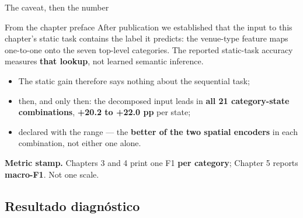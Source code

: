 \documentclass{beamer}
\begin{document}
\begin{frame}{The caveat, then the number}
    \begin{alertblock}{From the chapter preface}
        \small
        After publication we established that the input to this chapter's static task
        \alert{contains the label it predicts}: the venue-type feature maps one-to-one onto the
        seven top-level categories. The reported static-task accuracy measures \textbf{that
        lookup}, not learned semantic inference.
    \end{alertblock}

    \medskip
    \begin{itemize}\setlength{\itemsep}{3pt}
        \item<1-> \alert{The static gain therefore says nothing about the sequential task};
        \item<2-> then, and only then: the decomposed input leads in \textbf{all 21
              category-state combinations}, \textbf{+20.2 to +22.0 pp} per state;
        \item<2-> declared with the range --- the \textbf{better of the two spatial encoders} in
              each combination, not either one alone.
    \end{itemize}

    \vfill
    {\scriptsize\color{secondary}\textbf{Metric stamp.} Chapters 3 and 4 print one F1
    \textbf{per category}; Chapter 5 reports \textbf{macro-F1}. Not one scale.\par}
\end{frame}

\subsection{Resultado diagnóstico}
\end{document}
